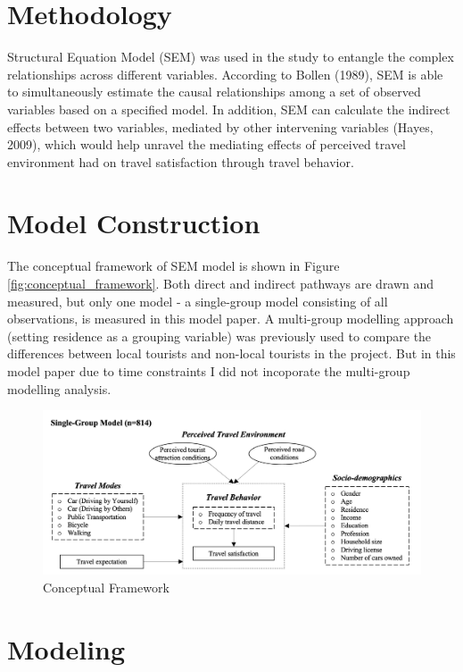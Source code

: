 \documentclass[
11pt, %
oneside, %
english, %
singlespacing, %
]{macthesis} %
\begin{document}
\section{Methodology}\label{methodology}

Structural Equation Model (SEM) was used in the study to entangle the complex relationships across different variables. According to Bollen (1989), SEM is able to simultaneously estimate the causal relationships among a set of observed variables based on a specified model. In addition, SEM can calculate the indirect effects between two variables, mediated by other intervening variables (Hayes, 2009), which would help unravel the mediating effects of perceived travel environment had on travel satisfaction through travel behavior.

\section{Model Construction}\label{model-construction}

The conceptual framework of SEM model is shown in Figure \ref{fig:conceptual_framework}. Both direct and indirect pathways are drawn and measured, but only one model - a single-group model consisting of all observations, is measured in this model paper. A multi-group modelling approach (setting residence as a grouping variable) was previously used to compare the differences between local tourists and non-local tourists in the project. But in this model paper due to time constraints I did not incoporate the multi-group modelling analysis.

\begin{figure}

{\centering \includegraphics[width=0.8\linewidth]{figure/conceptual_framework} 

}

\caption{\label{fig:conceptual_framework} Conceptual Framework}\label{fig:fig2-conceptual-frmework}
\end{figure}

\section{Modeling}\label{modeling}
\end{document}
